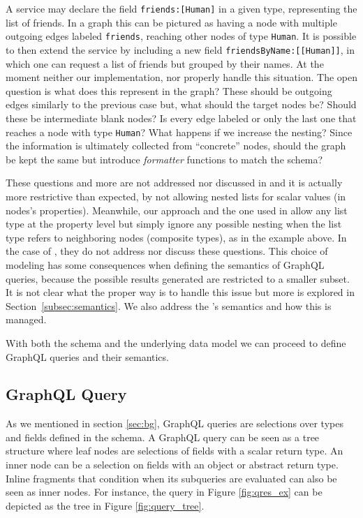 A service may declare the field \texttt{friends:[Human]} in a given type, representing the list of friends.
In a graph this can be pictured as having a node with multiple outgoing edges labeled \texttt{friends}, reaching other nodes of type \texttt{Human}. It is possible to then extend the service by including a new field \texttt{friendsByName:[[Human]]}, in which one can request a list of friends but grouped by their names. At the moment neither our implementation, \HP{} nor \cite{olafschema} properly handle this situation. The open question is what does this represent in the graph? These should be outgoing edges similarly to the previous case but, what should the target nodes be? Should these be intermediate blank nodes? Is every edge labeled or only the last one that reaches a node with type \texttt{Human}? What happens if we increase the nesting? Since the information is ultimately collected from ``concrete'' nodes, should the graph be kept the same but introduce \textit{formatter} functions to match the schema?

These questions and more are not addressed nor discussed in \HP{} and it is actually more restrictive than expected, by not allowing nested lists for scalar values (in nodes's properties). Meanwhile, our approach and the one used in \cite{olafschema} allow any list type at the property level but simply ignore any possible nesting when the list type refers to neighboring nodes (composite types), as in the example above. In the case of \cite{olafschema}, they do not address nor discuss these questions. This choice of modeling has some consequences when defining the semantics of GraphQL queries, because the possible results generated are restricted to a smaller subset. It is not clear what the proper way is to handle this issue but more is explored in Section~\ref{subsec:semantics}. We also address the \spec{}'s semantics and how this is managed.

With both the schema and the underlying data model we can proceed to define GraphQL queries and their semantics.

\subsection{GraphQL Query}\label{subsec:query}

As we mentioned in section \ref{sec:bg}, GraphQL queries are selections over types and fields defined in the schema. A GraphQL query can be seen as a tree structure where leaf nodes are selections of fields with a scalar return type. An inner node can be a selection on fields with an object or abstract return type. Inline fragments that condition when its subqueries are evaluated can also be seen as inner nodes. For instance, the query in Figure \ref{fig:qres_ex} can be depicted as the tree in Figure \ref{fig:query_tree}.

